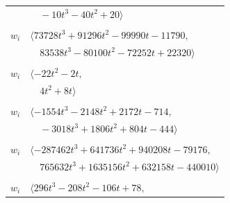 \documentclass[11pt]{article}
\begin{document}
\begin{longtable}{@{}ll@{}}
 & $\quad -10t^{3}-40t^{2}+20\rangle$\\
\addlinespace[2pt]
\multicolumn{2}{@{}p{0.97\textwidth}@{}}{$i=14$, $D_i=64$, $\rho_{ij}$: $3{:}2, \allowbreak 5{:}2, \allowbreak 7{:}2, \allowbreak 10{:}1, \allowbreak 16{:}2, \allowbreak 22{:}2, \allowbreak 24{:}2, \allowbreak 26{:}1, \allowbreak 27{:}2, \allowbreak 29{:}2, \allowbreak 43{:}2, \allowbreak 47{:}2, \allowbreak 51{:}1, \allowbreak 53{:}1, \allowbreak 54{:}2$}\\
$w_i$ & $\langle 73728t^{3}+91296t^{2}-99990t-11790,$\\
 & $\quad 83538t^{3}-80100t^{2}-72252t+22320\rangle$\\
\addlinespace[2pt]
\multicolumn{2}{@{}p{0.97\textwidth}@{}}{$i=15$, $D_i=2$, $\rho_{ij}$: $8{:}1, \allowbreak 11{:}1, \allowbreak 28{:}2, \allowbreak 42{:}2, \allowbreak 58{:}1$}\\
$w_i$ & $\langle -22t^{2}-2t,$\\
 & $\quad 4t^{2}+8t\rangle$\\
\addlinespace[2pt]
\multicolumn{2}{@{}p{0.97\textwidth}@{}}{$i=16$, $D_i=8$, $\rho_{ij}$: $6{:}2, \allowbreak 7{:}1, \allowbreak 14{:}1, \allowbreak 24{:}1, \allowbreak 25{:}2, \allowbreak 30{:}1, \allowbreak 34{:}1, \allowbreak 38{:}2, \allowbreak 40{:}2, \allowbreak 43{:}1, \allowbreak 51{:}2, \allowbreak 53{:}1$}\\
$w_i$ & $\langle -1554t^{3}-2148t^{2}+2172t-714,$\\
 & $\quad -3018t^{3}+1806t^{2}+804t-444\rangle$\\
\addlinespace[2pt]
\multicolumn{2}{@{}p{0.97\textwidth}@{}}{$i=17$, $D_i=16$, $\rho_{ij}$: $3{:}2, \allowbreak 5{:}1, \allowbreak 8{:}1, \allowbreak 9{:}1, \allowbreak 10{:}1, \allowbreak 12{:}1, \allowbreak 22{:}2, \allowbreak 27{:}1, \allowbreak 28{:}1, \allowbreak 32{:}2, \allowbreak 34{:}2, \allowbreak 36{:}2, \allowbreak 39{:}1, \allowbreak 41{:}2, \allowbreak 47{:}2, \allowbreak 50{:}2, \allowbreak 51{:}2$}\\
$w_i$ & $\langle -287462t^{3}+641736t^{2}+940208t-79176,$\\
 & $\quad 765632t^{3}+1635156t^{2}+632158t-440010\rangle$\\
\addlinespace[2pt]
\multicolumn{2}{@{}p{0.97\textwidth}@{}}{$i=18$, $D_i=16$, $\rho_{ij}$: $3{:}2, \allowbreak 4{:}1, \allowbreak 6{:}2, \allowbreak 27{:}1, \allowbreak 34{:}1, \allowbreak 41{:}2, \allowbreak 49{:}1, \allowbreak 52{:}1, \allowbreak 54{:}1, \allowbreak 56{:}2$}\\
$w_i$ & $\langle 296t^{3}-208t^{2}-106t+78,$\\

\end{longtable}
\end{document}
